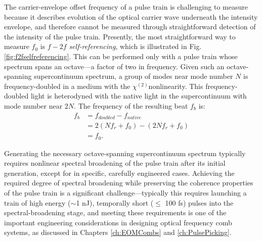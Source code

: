 The carrier-envelope offset frequency of a pulse train is challenging to measure because it describes evolution of the optical carrier wave underneath the intensity envelope, and therefore cannot be measured through straightforward detection of the intensity of the pulse train. Presently, the most straightforward way to measure $f_0$ is $f-2f$ \textit{self-referencing}, which is illustrated in Fig.\ref{fig:f2fselfreferencing}. This can be performed only with a pulse train whose spectrum spans an octave---a factor of two in frequency. Given such an octave-spanning supercontinuum spectrum, a group of modes near mode number $N$ is frequency-doubled in a medium with the $\chi^{(2)}$nonlinearity\cite{Boyd2003}. This frequency-doubled light is heterodyned with the native light in the supercontinuum with mode number near $2N$. The frequency of the resulting beat $f_b$ is:
\begin{align}
f_b&=f_{doubled}-f_{native}\\
&=2(Nf_r+f_0)-(2Nf_r+f_0)\\
&=f_0.
\end{align}

Generating the necessary octave-spanning supercontinuum spectrum typically requires nonlinear spectral broadening of the pulse train after its initial generation, except for in specific, carefully engineered cases. Achieving the required degree of spectral broadening while preserving the coherence properties of the pulse train is a significant challenge---typically this requires launching a train of high energy ($\sim$1 nJ), temporally short ($\leq$ 100 fs) pulses into the spectral-broadening stage, and meeting these requirements is one of the important engineering considerations in designing optical frequency comb systems, as discussed in Chapters \ref{ch:EOMCombs} and \ref{ch:PulsePicking}. 


